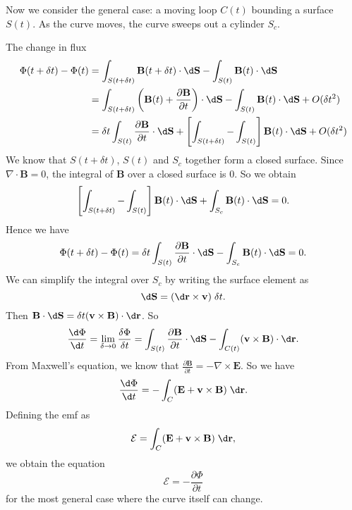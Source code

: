 \documentclass[a4paper]{article}
\begin{document}
Now we consider the general case: a moving loop $C(t)$ bounding a surface $S(t)$. As the curve moves, the curve sweeps out a cylinder $S_c$.
\begin{center}
\end{center}
The change in flux
\begin{align*}
  \Phi(t + \delta t) - \Phi(t) &= \int_{S(t + \delta t)} \mathbf{B}(t + \delta t)\cdot \d \mathbf{S} - \int_{S(t)}\mathbf{B}(t)\cdot \d \mathbf{S}\\
  &= \int_{S(t + \delta t)}\left(\mathbf{B}(t) + \frac{\partial \mathbf{B}}{\partial t}\right)\cdot \d \mathbf{S} - \int_{S(t)}\mathbf{B}(t)\cdot \d \mathbf{S} + O(\delta t^2)\\
  &= \delta t\int_{S(t)}\frac{\partial \mathbf{B}}{\partial t}\cdot \d \mathbf{S} + \left[\int_{S(t + \delta t)} - \int_{S(t)}\right]\mathbf{B}(t)\cdot \d \mathbf{S} + O(\delta t^2)
\end{align*}
We know that $S(t + \delta t)$, $S(t)$ and $S_c$ together form a closed surface. Since $\nabla\cdot \mathbf{B} = 0$, the integral of $\mathbf{B}$ over a closed surface is $0$. So we obtain
\[
  \left[\int_{S(t + \delta t)} - \int_{S(t)}\right]\mathbf{B}(t)\cdot \d \mathbf{S} + \int_{S_c}\mathbf{B}(t)\cdot \d \mathbf{S} = 0.
\]
Hence we have
\[
  \Phi(t + \delta t) - \Phi(t) = \delta t\int_{S(t)}\frac{\partial \mathbf{B}}{\partial t}\cdot \d \mathbf{S} - \int_{S_c}\mathbf{B}(t)\cdot \d \mathbf{S} = 0.
\]
We can simplify the integral over $S_c$ by writing the surface element as
\[
  \d \mathbf{S} = (\d \mathbf{r}\times \mathbf{v})\;\delta t.
\]
Then $\mathbf{B}\cdot \d \mathbf{S} = \delta t(\mathbf{v}\times \mathbf{B}) \cdot \d \mathbf{r}$. So
\[
  \frac{\d \Phi}{\d t} = \lim_{\delta \to 0}\frac{\delta \Phi}{\delta t} = \int_{S(t)}\frac{\partial \mathbf{B}}{\partial t}\cdot \d \mathbf{S} - \int_{C(t)}(\mathbf{v}\times \mathbf{B})\cdot \d \mathbf{r}.
\]
From Maxwell's equation, we know that $\frac{\partial \mathbf{B}}{\partial t} = -\nabla \times \mathbf{E}$. So we have
\[
  \frac{\d \Phi}{\d t} = -\int_C (\mathbf{E} + \mathbf{v}\times \mathbf{B})\;\d \mathbf{r}.
\]
Defining the emf as
\[
  \mathcal{E} = \int_C (\mathbf{E} + \mathbf{v}\times \mathbf{B})\;\d \mathbf{r},
\]
we obtain the equation
\[
  \mathcal{E} = -\frac{\partial \Phi}{\partial t}
\]
for the most general case where the curve itself can change.
\end{document}
